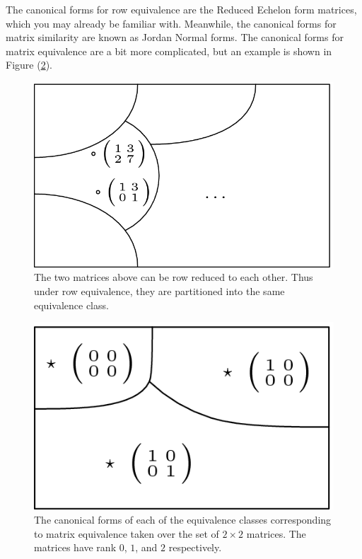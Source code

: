 \documentclass{article}
\begin{document}
        \vspace{3mm}
         The canonical forms for row equivalence are the Reduced Echelon form matrices, which you may already be familiar with. Meanwhile, the canonical forms for matrix similarity are known as Jordan Normal forms. The canonical forms for matrix equivalence are a bit more complicated, but an example is shown in Figure (\ref*{fig:2}).
        
        \begin{figure}[H]
            \centering
            \captionsetup{width=.6\linewidth}
            \includegraphics[scale = .3]{sp23/hw-supplements/hw5-supp/images/linalg_reduced_echelon_form_equiv_classes.png}
            \caption{The two matrices above can be row reduced to each other. Thus under row equivalence, they are partitioned into the same equivalence class.}
            \label{fig:1}
        \end{figure}

        \begin{figure}[H]
            \centering
            \captionsetup{width=.6\linewidth}
            \includegraphics[scale = .4]{sp23/hw-supplements/hw5-supp/images/linalg_2by2_rank_equivalence_classes.png}
            \caption{The canonical forms of each of the equivalence classes corresponding to matrix equivalence taken over the set of $2 \times 2$ matrices. The matrices have rank $0$, $1$, and $2$ respectively.}
            \label{fig:2}
        \end{figure}
\end{document}
